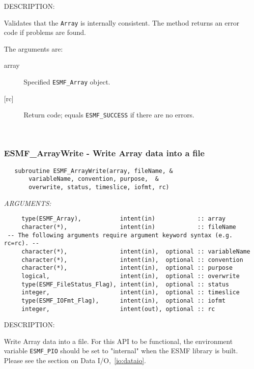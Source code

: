 {\sf DESCRIPTION:\\ }


        Validates that the {\tt Array} is internally consistent.
        The method returns an error code if problems are found.  
  
       The arguments are:
       \begin{description}
       \item[array] 
            Specified {\tt ESMF\_Array} object.
       \item[{[rc]}] 
            Return code; equals {\tt ESMF\_SUCCESS} if there are no errors.
       \end{description}
   
 
\mbox{}\hrulefill\ 
 
\subsubsection [ESMF\_ArrayWrite] {ESMF\_ArrayWrite - Write Array data into a file}


   \label{api:ArrayWrite}
  
\begin{verbatim}   subroutine ESMF_ArrayWrite(array, fileName, &
       variableName, convention, purpose,  &
       overwrite, status, timeslice, iofmt, rc)\end{verbatim}{\em ARGUMENTS:}
\begin{verbatim}     type(ESMF_Array),           intent(in)            :: array
     character(*),               intent(in)            :: fileName
 -- The following arguments require argument keyword syntax (e.g. rc=rc). --
     character(*),               intent(in),  optional :: variableName
     character(*),               intent(in),  optional :: convention
     character(*),               intent(in),  optional :: purpose
     logical,                    intent(in),  optional :: overwrite
     type(ESMF_FileStatus_Flag), intent(in),  optional :: status
     integer,                    intent(in),  optional :: timeslice
     type(ESMF_IOFmt_Flag),      intent(in),  optional :: iofmt
     integer,                    intent(out), optional :: rc\end{verbatim}
{\sf DESCRIPTION:\\ }


     Write Array data into a file. For this API to be functional, the 
     environment variable {\tt ESMF\_PIO} should be set to "internal" when 
     the ESMF library is built.  Please see the section on 
     Data I/O,~\ref{io:dataio}. 
  
